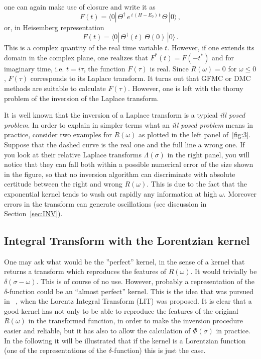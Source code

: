 one can again make use of closure and write it as  
\begin{equation}
F(t)=\langle 0|\,\Theta^\dagger\, e^{\,i\, (H-E_0)\, t} \,\Theta\,|0\rangle\,,
\end{equation}
or, in Heisemberg representation  
\begin{equation}
F(t)=\langle 0|\,\Theta^\dagger(t) \,\Theta(0)\,|0\rangle\,.
\end{equation}
This is a complex quantity of the real time variable $t$. However, if one extends its domain in the complex plane, one realizes 
that $F^*(t)=F(-t^*)$ and for imaginary time, i.e. $t=i \tau$,  the function $F(\tau)$ is real. Since $R(\omega) = 0$ for $\omega\leq 0$,
$F(\tau)$  corresponds to its Laplace transform. It turns out that GFMC or DMC methods are suitable
to calculate $F(\tau)$. However, one is left with the thorny problem of the inversion of the Laplace transform.

It is well known that the inversion of a Laplace transform is a typical {\it ill posed problem}. In order to explain in simpler terms 
what an {\it ill posed problem}  means in practice, consider two examples for $R(\omega)$ as plotted in the left panel of~\ref{fig:3}. 
Suppose that the dashed curve
is the real one and the full line a wrong one. If you look at their relative Laplace transforms $\Lambda(\sigma)$ in the right panel, 
you will notice
that they can fall both within a possible numerical error of the size shown in the figure, so that no inversion algorithm 
can discriminate with absolute certitude between the right and wrong $R(\omega)$.
This is due to the fact that the exponential kernel tends to wash out rapidly any information at high $\omega$.
Moreover errors in the transform can generate oscillations (see discussion in Section~\ref{sec:INV}). 

\subsection{Integral Transform with the Lorentzian kernel}\label{sec:LIT}

One may ask what would be the ''perfect'' kernel, in the sense of a kernel that returns a transform which reproduces the features of
$R(\omega)$. It would trivially be $\delta(\sigma-\omega)$. This is of course of no use. However, probably a representation 
of the $\delta$-function could be an ``almost perfect'' kernel. This is the idea that was pursued in~ \cite{ELO94}, 
when the Lorentz Integral Transform (LIT) was proposed. It is clear that a good kernel has not only to be able to reproduce 
 the features of the original $R(\omega)$ in the transformed function, in order to make the inversion procedure easier and reliable, 
but it has also to allow the calculation
of $\Phi(\sigma)$ in practice. In the following it will be illustrated that if the kernel is a Lorentzian 
function (one of the representations of the $\delta$-function) this is just the case.

